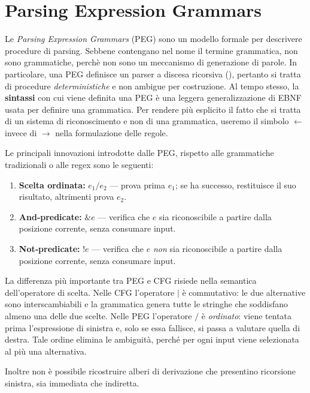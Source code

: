 \section{Parsing Expression Grammars}

Le \emph{Parsing Expression Grammars} (PEG) sono un modello formale per descrivere procedure di parsing.
Sebbene contengano nel nome il termine grammatica, non sono grammatiche, perchè non sono un meccanismo di generazione di
parole.
In particolare, una PEG definisce un parser a discesa ricorsiva (), pertanto si tratta di
procedure \emph{deterministiche} e non ambigue per costruzione.
Al tempo stesso, la \textbf{sintassi} con cui viene definita una PEG è una leggera generalizzazione di EBNF usata per
definire una grammatica.
Per rendere più esplicito il fatto che si tratta di un sistema di riconoscimento e non di una grammatica, useremo il
simbolo $\gets$ invece di $\to$ nella formulazione delle regole.


Le principali innovazioni introdotte dalle PEG, rispetto alle grammatiche tradizionali o alle regex sono le seguenti:

\begin{enumerate}
    \item \textbf{Scelta ordinata:} \( e_1 / e_2 \) --- prova prima \( e_1 \); se ha successo, restituisce il suo risultato, altrimenti prova \( e_2 \).
    \item \textbf{And‑predicate:} \( \&e \) --- verifica che \( e \) sia riconoscibile a partire dalla posizione corrente, senza consumare input.
    \item \textbf{Not‑predicate:} \( !e \) --- verifica che \( e \) \emph{non} sia riconoscibile a partire dalla posizione corrente, senza consumare input.
\end{enumerate}


La differenza più importante tra PEG e CFG risiede nella semantica dell'operatore di scelta. Nelle CFG l'operatore
\( | \) è commutativo: le due alternative sono interscambiabili e la grammatica genera tutte le stringhe che soddisfano
almeno una delle due scelte.
Nelle PEG l'operatore \( / \) è \emph{ordinato}: viene tentata prima l'espressione di sinistra e, solo se essa fallisce,
si passa a valutare quella di destra.
Tale ordine elimina le ambiguità, perché per ogni input viene selezionata al più una alternativa.

Inoltre non è possibile ricostruire alberi di derivazione che presentino ricorsione sinistra, sia immediata che indiretta.


